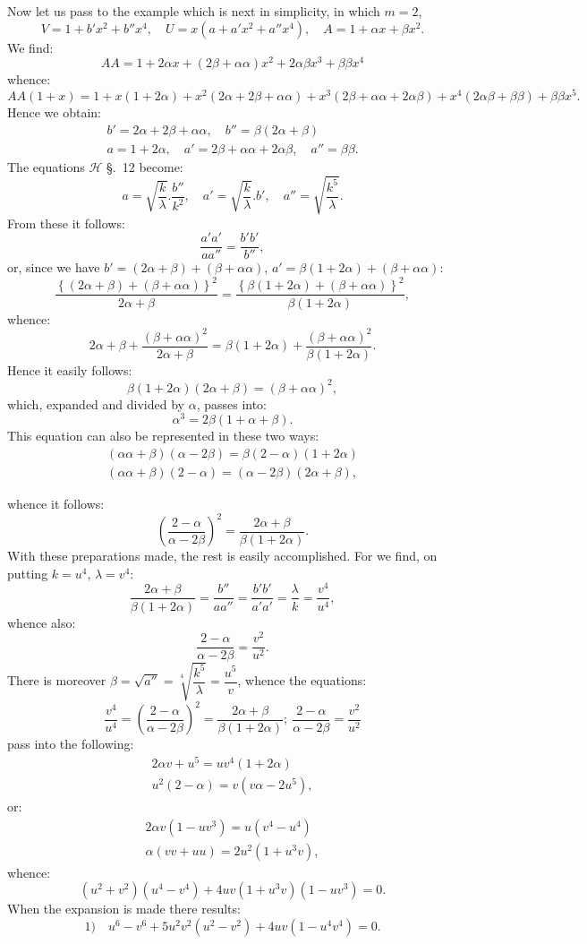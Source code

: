 \documentclass{article}
\begin{document}
Now let us pass to the example which is next in simplicity, in which $m=2$,
\[
V=1+b'x^{2}+b''x^{4},\quad U=x(a+a'x^{2}+a''x^{4}),\quad A=1+\alpha x+\beta x^{2}.
\]
We find:
\[
AA=1+2\alpha x+(2\beta+\alpha\alpha)x^{2}+2\alpha\beta x^{3}+\beta\beta x^{4}
\]
whence:
\[
AA(1+x)=1+x(1+2\alpha)+x^{2}(2\alpha+2\beta+\alpha\alpha)+x^{3}(2\beta+\alpha\alpha+2\alpha\beta)+x^{4}(2\alpha\beta+\beta\beta)+\beta\beta x^{5}.
\]
Hence we obtain:
\[
\begin{gathered}
b'=2\alpha+2\beta+\alpha\alpha,\quad b''=\beta(2\alpha+\beta)\\
a=1+2\alpha,\quad a'=2\beta+\alpha\alpha+2\alpha\beta,\quad a''=\beta\beta.
\end{gathered}
\]
The equations $\mathcal{H}$ §.\ 12 become:
\[
a=\sqrt{\frac{k}{\lambda}}.\frac{b''}{k^{2}},\quad a'=\sqrt{\frac{k}{\lambda}}.b',\quad a''=\sqrt{\frac{k^{5}}{\lambda}}.
\]
From these it follows:
\[
\frac{a'a'}{aa''}=\frac{b'b'}{b''},
\]
or, since we have $b'=(2\alpha+\beta)+(\beta+\alpha\alpha)$, $a'=\beta(1+2\alpha)+(\beta+\alpha\alpha)$:
\[
\frac{\left\{(2\alpha+\beta)+(\beta+\alpha\alpha)\right\}^{2}}{2\alpha+\beta}=\frac{\left\{\beta(1+2\alpha)+(\beta+\alpha\alpha)\right\}^{2}}{\beta(1+2\alpha)},
\]
whence:
\[
2\alpha+\beta+\frac{(\beta+\alpha\alpha)^{2}}{2\alpha+\beta}=\beta(1+2\alpha)+\frac{(\beta+\alpha\alpha)^{2}}{\beta(1+2\alpha)}.
\]
Hence it easily follows:
\[
\beta(1+2\alpha)(2\alpha+\beta)=(\beta+\alpha\alpha)^{2},
\]
which, expanded and divided by $\alpha$, passes into:
\[
\alpha^{3}=2\beta(1+\alpha+\beta).
\]
This equation can also be represented in these two ways:
\[
\begin{gathered}
(\alpha\alpha+\beta)(\alpha-2\beta)=\beta(2-\alpha)(1+2\alpha)\\
(\alpha\alpha+\beta)(2-\alpha)=(\alpha-2\beta)(2\alpha+\beta),
\end{gathered}
\]

whence it follows:
\[
\left(\frac{2-\alpha}{\alpha-2\beta}\right)^{2}=\frac{2\alpha+\beta}{\beta(1+2\alpha)}.
\]
With these preparations made, the rest is easily accomplished. For we find, on putting $k=u^{4}$, $\lambda=v^{4}$:
\[
\frac{2\alpha+\beta}{\beta(1+2\alpha)}=\frac{b''}{aa''}=\frac{b'b'}{a'a'}=\frac{\lambda}{k}=\frac{v^{4}}{u^{4}},
\]
whence also:
\[
\frac{2-\alpha}{\alpha-2\beta}=\frac{v^{2}}{u^{2}}.
\]
There is moreover $\beta=\sqrt{a''}=\sqrt[4]{\dfrac{k^{5}}{\lambda}}=\dfrac{u^{5}}{v}$, whence the equations:
\[
\frac{v^{4}}{u^{4}}=\left(\frac{2-\alpha}{\alpha-2\beta}\right)^{2}=\frac{2\alpha+\beta}{\beta(1+2\alpha)};\ \frac{2-\alpha}{\alpha-2\beta}=\frac{v^{2}}{u^{2}}
\]
pass into the following:
\[
\begin{gathered}
2\alpha v+u^{5}=uv^{4}(1+2\alpha)\\
u^{2}(2-\alpha)=v(v\alpha-2u^{5}),
\end{gathered}
\]
or:
\[
\begin{gathered}
2\alpha v(1-uv^{3})=u(v^{4}-u^{4})\\
\alpha(vv+uu)=2u^{2}(1+u^{3}v),
\end{gathered}
\]
whence:
\[
(u^{2}+v^{2})(u^{4}-v^{4})+4uv(1+u^{3}v)(1-uv^{3})=0.
\]
When the expansion is made there results:
\[
\text{1)}\quad u^{6}-v^{6}+5u^{2}v^{2}(u^{2}-v^{2})+4uv(1-u^{4}v^{4})=0.
\]
\end{document}
